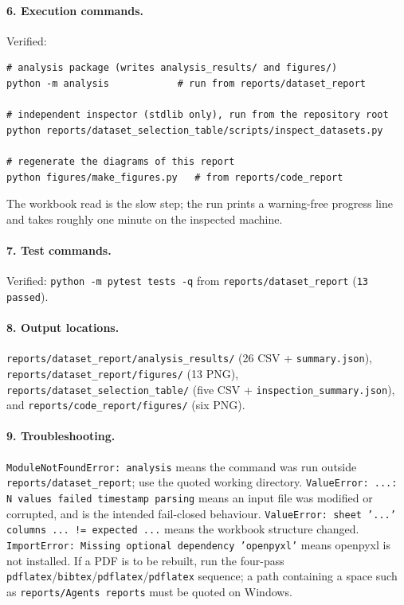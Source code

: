 \documentclass[11pt,a4paper]{article}
\newcommand{\code}[1]{\texttt{#1}}
\begin{document}
\paragraph{6. Execution commands.} Verified:
\begin{verbatim}
# analysis package (writes analysis_results/ and figures/)
python -m analysis            # run from reports/dataset_report

# independent inspector (stdlib only), run from the repository root
python reports/dataset_selection_table/scripts/inspect_datasets.py

# regenerate the diagrams of this report
python figures/make_figures.py   # from reports/code_report
\end{verbatim}
The workbook read is the slow step; the run prints a warning-free progress line and takes roughly one minute on the inspected machine.

\paragraph{7. Test commands.} Verified: \code{python -m pytest tests -q} from \code{reports/dataset\_report} (\code{13 passed}).

\paragraph{8. Output locations.} \code{reports/dataset\_report/analysis\_results/} (26 CSV + \code{summary.json}), \code{reports/dataset\_report/figures/} (13 PNG), \code{reports/dataset\_selection\_table/} (five CSV + \code{inspection\_summary.json}), and \code{reports/code\_report/figures/} (six PNG).

\paragraph{9. Troubleshooting.} \code{ModuleNotFoundError: analysis} means the command was run outside \code{reports/dataset\_report}; use the quoted working directory. \code{ValueError: ...: N values failed timestamp parsing} means an input file was modified or corrupted, and is the intended fail-closed behaviour. \code{ValueError: sheet '...' columns ... != expected ...} means the workbook structure changed. \code{ImportError: Missing optional dependency 'openpyxl'} means openpyxl is not installed. If a PDF is to be rebuilt, run the four-pass \code{pdflatex}/\code{bibtex}/\code{pdflatex}/\code{pdflatex} sequence; a path containing a space such as \code{reports/Agents reports} must be quoted on Windows.
\end{document}
